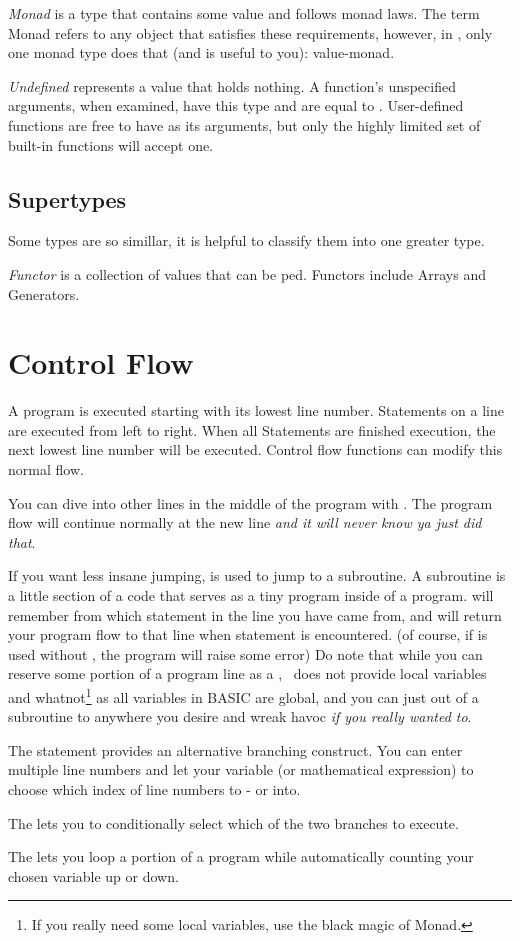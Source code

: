 \emph{Monad} is a type that contains some value and follows monad laws. The term Monad refers to any object that satisfies these requirements, however, in \tbas, only one monad type does that (and is useful to you): value-monad.

\emph{Undefined} represents a value that holds nothing. A function's unspecified arguments, when examined, have this type and are equal to . User-defined functions are free to have  as its arguments, but only the highly limited set of built-in functions will accept one.

\subsection{Supertypes}

Some types are so simillar, it is helpful to classify them into one greater type.

\emph{Functor} is a collection of values that can be ped. Functors include Arrays and Generators.

\section{Control Flow}

A program is executed starting with its lowest line number. Statements on a line are executed from left to right. When all Statements are finished execution, the next lowest line number will be executed. Control flow functions can modify this normal flow.

You can dive into other lines in the middle of the program with . The program flow will continue normally at the new line \emph{and it will never know ya just did that}.

If you want less insane jumping,  is used to jump to a subroutine. A subroutine is a little section of a code that serves as a tiny program inside of a program.  will remember from which statement in the line you have came from, and will return your program flow to that line when  statement is encountered. (of course, if  is used without , the program will raise some error) Do note that while you can reserve some portion of a program line as a , \tbas\ does not provide local variables and whatnot\footnote{If you really need some local variables, use the black magic of Monad.} as all variables in BASIC are global, and you can just  out of a subroutine to anywhere you desire and wreak havoc \emph{if you really wanted to}.

The  statement provides an alternative branching construct. You can enter multiple line numbers and let your variable (or mathematical expression) to choose which index of line numbers to - or  into.

The  lets you to conditionally select which of the two branches to execute.

The  lets you loop a portion of a program while automatically counting your chosen variable up or down.
